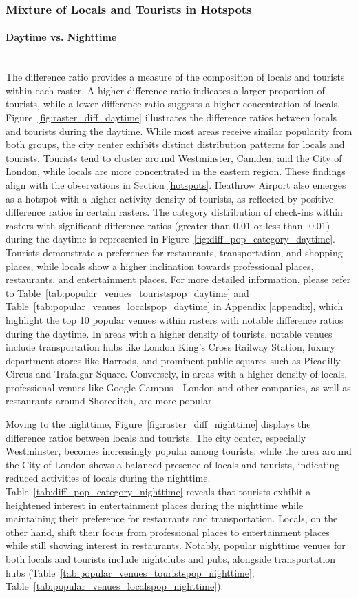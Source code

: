\documentclass{article}
\newcommand{\subsubsubsection}[1]{\paragraph{#1}\mbox{}\\}
\theoremstyle{definition}
\theoremstyle{remark}
\begin{document}
\subsubsection{Mixture of Locals and Tourists in Hotspots}

\subsubsubsection{Daytime vs. Nighttime}
The difference ratio provides a measure of the composition of locals and tourists within each raster. A higher difference ratio indicates a larger proportion of tourists, while a lower difference ratio suggests a higher concentration of locals. Figure~\ref{fig:raster_diff_daytime} illustrates the difference ratios between locals and tourists during the daytime. While most areas receive similar popularity from both groups, the city center exhibits distinct distribution patterns for locals and tourists. Tourists tend to cluster around Westminster, Camden, and the City of London, while locals are more concentrated in the eastern region. These findings align with the observations in Section \ref{hotspots}. Heathrow Airport also emerges as a hotspot with a higher activity density of tourists, as reflected by positive difference ratios in certain rasters. The category distribution of check-ins within rasters with significant difference ratios (greater than 0.01 or less than -0.01) during the daytime is represented in Figure~\ref{fig:diff_pop_category_daytime}. Tourists demonstrate a preference for restaurants, transportation, and shopping places, while locals show a higher inclination towards professional places, restaurants, and entertainment places. For more detailed information, please refer to Table~\ref{tab:popular_venues_touristspop_daytime} and Table~\ref{tab:popular_venues_localspop_daytime} in Appendix \ref{appendix}, which highlight the top 10 popular venues within rasters with notable difference ratios during the daytime. In areas with a higher density of tourists, notable venues include transportation hubs like London King's Cross Railway Station, luxury department stores like Harrods, and prominent public squares such as Picadilly Circus and Trafalgar Square. Conversely, in areas with a higher density of locals, professional venues like Google Campus - London and other companies, as well as restaurants around Shoreditch, are more popular.

Moving to the nighttime, Figure~\ref{fig:raster_diff_nighttime} displays the difference ratios between locals and tourists. The city center, especially Westminster, becomes increasingly popular among tourists, while the area around the City of London shows a balanced presence of locals and tourists, indicating reduced activities of locals during the nighttime. Table~\ref{tab:diff_pop_category_nighttime} reveals that tourists exhibit a heightened interest in entertainment places during the nighttime while maintaining their preference for restaurants and transportation. Locals, on the other hand, shift their focus from professional places to entertainment places while still showing interest in restaurants. Notably, popular nighttime venues for both locals and tourists include nightclubs and pubs, alongside transportation hubs (Table~\ref{tab:popular_venues_touristspop_nighttime}, Table~\ref{tab:popular_venues_localspop_nighttime}).
\end{document}
